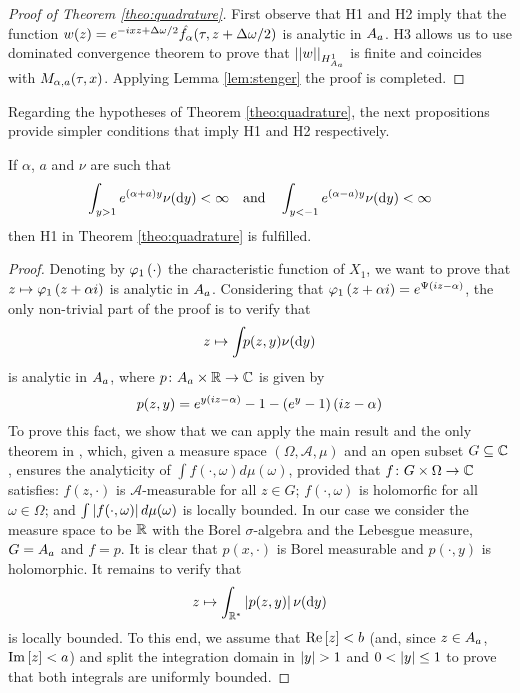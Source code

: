 \documentclass[11pt]{amsart}
\begin{document}
\begin{proof}[Proof of Theorem \ref{theo:quadrature}]
First observe that H1 and H2 imply that the function $w(z)=e^{-i x z + \Delta\omega/2}\hat{f_{\alpha}}(\tau,z+ \Delta\omega/2)$ is analytic in $A_{a}$. 
H3 allows us to use dominated convergence theorem to prove that $\left| {\left| {{w}} \right|} \right|_{H^1_{A_a}}$ is finite and coincides with $M_{\alpha,a}(\tau,x)$. Applying Lemma \ref{lem:stenger} 
the proof is completed.
\end{proof}

Regarding the hypotheses of Theorem \ref{theo:quadrature}, the next propositions provide simpler conditions that imply H1 and H2 respectively.

\begin{proposition} \label{prop:analy1}
If $\alpha$, $a$ and $\nu$ are such that
\begin{equation}
\label{eq:alterH1}
\int_{y>1} e^{\left( {\alpha+a} \right)y}\nu(\textrm{d} y) < \infty \quad \text{and}\quad \int_{y<-1} e^{\left( {\alpha-a} \right)y}\nu(\textrm{d} y) < \infty
\end{equation}
then H1 in Theorem \ref{theo:quadrature} is fulfilled.

\begin{proof}
Denoting by $\varphi_{1} \left( {{\cdot}} \right)$ the characteristic function of $X_1$, we want to prove that $z\mapsto \varphi_{1} \left( {{z+\alpha i}} \right)$ is analytic in $A_{a}$. Considering that $\varphi_{1} \left( {{z+\alpha i}} \right)=e^{\Psi \left( {{iz-\alpha}} \right)}$, the only non-trivial part of the proof is to verify that 
\begin{equation}
z\mapsto \int_{} p(z,y)\nu(\textrm{d} y)
\end{equation}
is analytic in $A_{a}$,
where $p\colon A_{a} \times \mathbb{R} \to \mathbb{C}$ is given by
$$p(z,y)=e^{y \left( {i z-\alpha} \right)}-1-(e^{y}-1)\left( {i z-\alpha} \right)$$
To prove this fact, we show that we can apply the main result and the only theorem in \cite{mattner2001complex}, 
which, given a measure space $(\Omega,\mathcal{A},\mu)$ and an open subset $G\subseteq \mathbb{C}$, 
ensures the analyticity of $\int f(\cdot,\omega) d\mu(\omega)$, provided that $f\colon G\times \Omega \to \mathbb{C}$ satisfies: $f(z,\cdot)$ is $\mathcal{A}$-measurable for all $z\in G$; $f(\cdot,\omega)$ is holomorfic for all $\omega \in \Omega$; and $\int \left| {f(\cdot,\omega)} \right| d\mu(\omega)$ is locally bounded.
In our case we consider the measure space to be $\mathbb{R}$ with the Borel $\sigma$-algebra and the Lebesgue measure, $G=A_{a}$ and $f=p$. It is clear that 
$p(x,\cdot)$ is Borel measurable and $p(\cdot,y)$ is holomorphic. It remains to verify that  
\begin{equation*}
z \mapsto \int_{\mathbb{R}^*} \left| {p(z,y)} \right|\nu(\textrm{d} y)
\end{equation*} 
is locally bounded. 
To this end, we assume that $\mathrm{Re}\left[z\right]<b$ (and, since $z\in A_{a}$, $\mathrm{Im}\left[z\right]<a$) and split the integration domain in $\absval{y}>1$ and ${0<\left| {y} \right|\leq 1}$ to prove that both integrals are uniformly bounded.


\end{proof}
\end{proposition}
\end{document}
